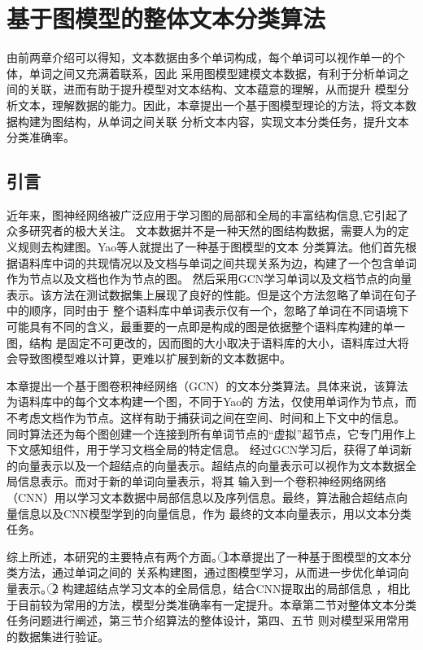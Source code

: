 \chapter{基于图模型的整体文本分类算法}
由前两章介绍可以得知，文本数据由多个单词构成，每个单词可以视作单一的个体，单词之间又充满着联系，因此
采用图模型建模文本数据，有利于分析单词之间的关联，进而有助于提升模型对文本结构、文本蕴意的理解，从而提升
模型分析文本，理解数据的能力。因此，本章提出一个基于图模型理论的方法，将文本数据构建为图结构，从单词之间关联
分析文本内容，实现文本分类任务，提升文本分类准确率。
\section{引言}
近年来，图神经网络被广泛应用于学习图的局部和全局的丰富结构信息,它引起了众多研究者的极大关注。
文本数据并不是一种天然的图结构数据，需要人为的定义规则去构建图。Yao等人就提出了一种基于图模型的文本
分类算法。他们首先根据语料库中词的共现情况以及文档与单词之间共现关系为边，构建了一个包含单词作为节点以及文档也作为节点的图。
然后采用GCN学习单词以及文档节点的向量表示。该方法在测试数据集上展现了良好的性能。但是这个方法忽略了单词在句子中的顺序，同时由于
整个语料库中单词表示仅有一个，忽略了单词在不同语境下可能具有不同的含义，最重要的一点即是构成的图是依据整个语料库构建的单一图，结构
是固定不可更改的，因而图的大小取决于语料库的大小，语料库过大将会导致图模型难以计算，更难以扩展到新的文本数据中。

本章提出一个基于图卷积神经网络（GCN）的文本分类算法。具体来说，该算法为语料库中的每个文本构建一个图，不同于Yao的
方法，仅使用单词作为节点，而不考虑文档作为节点。这样有助于捕获词之间在空间、时间和上下文中的信息。
同时算法还为每个图创建一个连接到所有单词节点的“虚拟”超节点，它专门用作上下文感知组件，用于学习文档全局的特定信息。
经过GCN学习后，获得了单词新的向量表示以及一个超结点的向量表示。超结点的向量表示可以视作为文本数据全局信息表示。而对于新的单词向量表示，将其
输入到一个卷积神经网络网络（CNN）用以学习文本数据中局部信息以及序列信息。最终，算法融合超结点向量信息以及CNN模型学到的向量信息，作为
最终的文本向量表示，用以文本分类任务。

综上所述，本研究的主要特点有两个方面。\noindent\textcircled{1}本章提出了一种基于图模型的文本分类方法，通过单词之间的
关系构建图，通过图模型学习，从而进一步优化单词向量表示。\noindent\textcircled{2} 构建超结点学习文本的全局信息，结合CNN提取出的局部信息
，相比于目前较为常用的方法，模型分类准确率有一定提升。本章第二节对整体文本分类任务问题进行阐述，第三节介绍算法的整体设计，第四、五节
则对模型采用常用的数据集进行验证。

